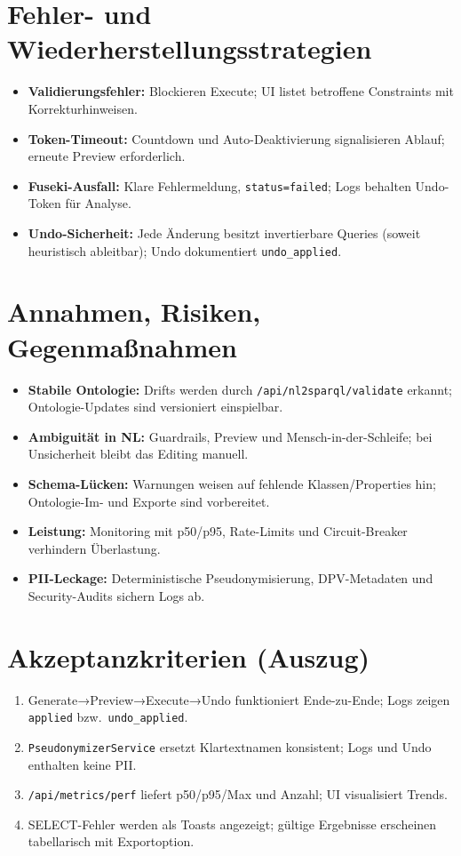 \section{Fehler- und Wiederherstellungsstrategien}
\begin{itemize}
  \item \textbf{Validierungsfehler:} Blockieren Execute; UI listet betroffene Constraints mit Korrekturhinweisen.
  \item \textbf{Token-Timeout:} Countdown und Auto-Deaktivierung signalisieren Ablauf; erneute Preview erforderlich.
  \item \textbf{Fuseki-Ausfall:} Klare Fehlermeldung, \texttt{status=failed}; Logs behalten Undo-Token für Analyse.
  \item \textbf{Undo-Sicherheit:} Jede Änderung besitzt invertierbare Queries (soweit heuristisch ableitbar); Undo dokumentiert \texttt{undo\_applied}.
\end{itemize}

\section{Annahmen, Risiken, Gegenmaßnahmen}
\begin{itemize}
  \item \textbf{Stabile Ontologie:} Drifts werden durch \texttt{/api/nl2sparql/validate} erkannt; Ontologie-Updates sind versioniert einspielbar.
  \item \textbf{Ambiguität in NL:} Guardrails, Preview und Mensch-in-der-Schleife; bei Unsicherheit bleibt das Editing manuell.
  \item \textbf{Schema-Lücken:} Warnungen weisen auf fehlende Klassen/Properties hin; Ontologie-Im- und Exporte sind vorbereitet.
  \item \textbf{Leistung:} Monitoring mit p50/p95, Rate-Limits und Circuit-Breaker verhindern Überlastung.
  \item \textbf{PII-Leckage:} Deterministische Pseudonymisierung, DPV-Metadaten und Security-Audits sichern Logs ab.
\end{itemize}

\section{Akzeptanzkriterien (Auszug)}
\begin{enumerate}
  \item Generate→Preview→Execute→Undo funktioniert Ende-zu-Ende; Logs zeigen \texttt{applied} bzw.\ \texttt{undo\_applied}.
  \item \texttt{PseudonymizerService} ersetzt Klartextnamen konsistent; Logs und Undo enthalten keine PII.
  \item \texttt{/api/metrics/perf} liefert p50/p95/Max und Anzahl; UI visualisiert Trends.
  \item SELECT-Fehler werden als Toasts angezeigt; gültige Ergebnisse erscheinen tabellarisch mit Exportoption.
\end{enumerate}

